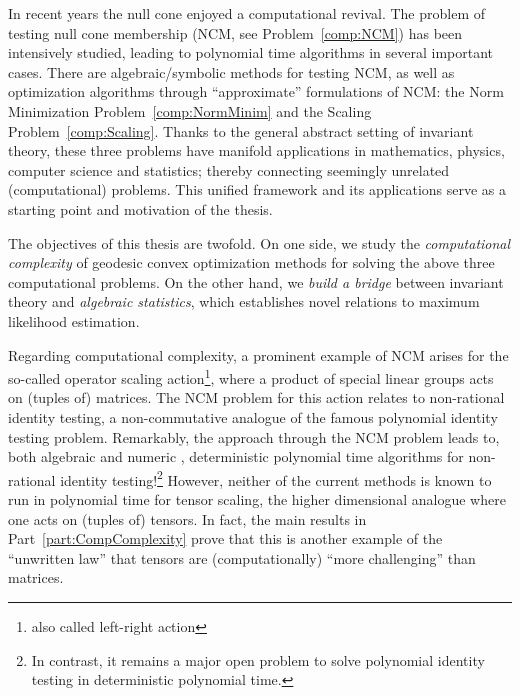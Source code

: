 In recent years the null cone enjoyed a computational revival.
The problem of testing null cone membership (NCM, see Problem~\ref{comp:NCM}) has been intensively studied, leading to polynomial time algorithms in several important cases. There are algebraic/symbolic methods for testing NCM, as well as optimization algorithms through ``approximate'' formulations of NCM: the Norm Minimization Problem~\ref{comp:NormMinim} and the Scaling Problem~\ref{comp:Scaling}. Thanks to the general abstract setting of invariant theory, these three problems have manifold applications in mathematics, physics, computer science and statistics; thereby connecting seemingly unrelated (computational) problems. This unified framework and its applications serve as a starting point and motivation of the thesis.


\bigskip

The objectives of this thesis are twofold. On one side, we study the \emph{computational complexity} of geodesic convex optimization methods for solving the above three computational problems. On the other hand, we \emph{build a bridge} between invariant theory and \emph{algebraic statistics}, which establishes novel relations to maximum likelihood estimation.

\bigskip

Regarding computational complexity, a prominent example of NCM arises for the so-called operator scaling action\footnote{also called left-right action}, where a product of special linear groups acts on (tuples of) matrices. The NCM problem for this action relates to non-rational identity testing, a non-commutative analogue of the famous polynomial identity testing problem. Remarkably, the approach through the NCM problem leads to, both algebraic \cite{derksen2017polynomial, ivanyos2017constructive} and numeric \cite{allen2018operator, garg2016deterministic}, deterministic polynomial time algorithms for non-rational identity testing!\footnote{In contrast, it remains a major open problem to solve polynomial identity testing in deterministic polynomial time.} However, neither of the current methods is known to run in polynomial time for tensor scaling, the higher dimensional analogue where one acts on (tuples of) tensors. In fact, the main results in Part~\ref{part:CompComplexity} prove that this is another example of the ``unwritten law'' that tensors are (computationally) ``more challenging'' than matrices.

